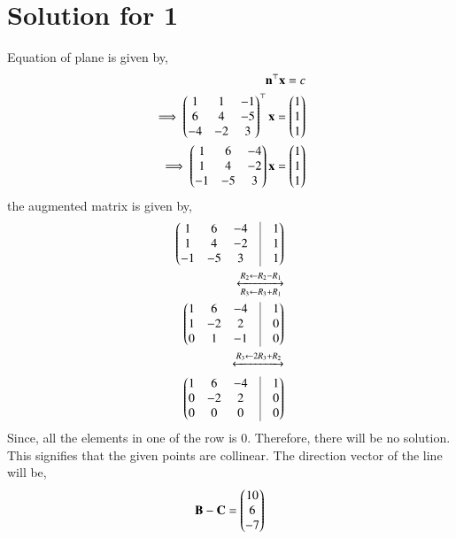 \documentclass[A4,11pt,twocolumn]{IEEEtran}
\begin{document}
\section{Solution for 1}
Equation of plane is given by,
\begin{align}
\mathbf{n}^\top \mathbf{x} = c\\
\implies \begin{pmatrix}1&1&-1\\6&4&-5\\-4&-2&3\end{pmatrix}^\top \mathbf{x}=\begin{pmatrix}1\\1\\1\end{pmatrix}\\
\implies \begin{pmatrix}1&6&-4\\ 1&4&-2\\ -1&-5&3\end{pmatrix} \mathbf{x} = \begin{pmatrix}1\\1\\1\end{pmatrix}\\
\end{align}
the augmented matrix is given by,
\begin{align}
\myvec{1&6&-4&\vrule&1\\1&4&-2&\vrule&1\\-1&-5&3&\vrule&1}\\
\xleftrightarrow[R_3 \leftarrow R_3 + R_1]{R_2 \leftarrow R_2 - R_1}\\
\myvec{1&6&-4&\vrule&1\\1&-2&2&\vrule&0\\0&1&-1&\vrule&0}\\
\xleftrightarrow{R_3 \leftarrow 2R_3 + R_2}\\
\myvec{1&6&-4&\vrule&1\\0&-2&2&\vrule&0\\0&0&0&\vrule&0}\\
\end{align}
Since, all the elements in one of the row is 0. Therefore, there will be no solution.
This signifies that the given points are collinear.
The direction vector of the line will be,
\begin{align}
\mathbf{B}-\mathbf{C} = \begin{pmatrix}10\\6\\-7\end{pmatrix}
\end{align}
\end{document}
